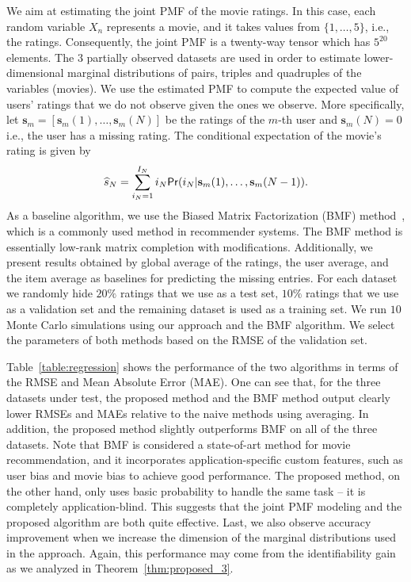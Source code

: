\documentclass[journal]{IEEEtran}
\begin{document}
We aim at estimating the joint PMF of the movie ratings. In this case, each random variable $X_n$ represents a movie, and it takes values from $\{1,\ldots,5\}$, i.e., the ratings.
Consequently, the joint PMF is a twenty-way tensor which has $5^{20}$ elements.
The $3$ partially observed datasets are used in order to estimate  {lower-dimensional} marginal distributions of pairs, triples and quadruples of the variables (movies). We use the estimated PMF to compute the expected value of  users' ratings that we do not observe given the ones we observe. More specifically, let  $\mathbf{s}_m = [\mathbf{s}_m(1),\ldots,\mathbf{s}_m(N)]$ be the ratings of the $m$-th user and $\mathbf{s}_m(N)=0$ i.e., the user has a missing rating. The conditional expectation of the movie's rating is given by
\[
\widehat{s}_N = \sum_{i_N = 1}^{I_N} i_N {\sf Pr}(i_N | \mathbf{s}_m(1),\ldots,\mathbf{s}_m(N-1)).
\]
As a baseline algorithm, we use the Biased Matrix Factorization (BMF) method~\cite{Koren2009}, which is a commonly used method in recommender systems. The BMF method is essentially low-rank matrix completion with modifications.
Additionally, we present results  obtained by global average of the ratings, the user average, and the item average  as baselines for predicting the missing entries. For each dataset we randomly hide $20\%$ ratings that we use as a test set, $10\%$ ratings that we use as a validation set and the remaining dataset is used as a training set. We run $10$ Monte Carlo simulations using our approach and the BMF algorithm. We select the parameters of both methods based on the RMSE of the validation set. 

Table~\ref{table:regression} shows the performance of the two algorithms in terms of the RMSE and Mean Absolute Error (MAE). One can see that, for the three datasets under test, the proposed method and the BMF method output clearly lower RMSEs and MAEs relative to the naive methods using averaging. In addition, the proposed method slightly outperforms BMF on all of the three datasets. Note that BMF is considered a state-of-art method for movie recommendation, and it incorporates application-specific custom features, such as user bias and movie bias to achieve good performance. The proposed method, on the other hand, only uses basic probability to handle the same task -- it is completely application-blind. This suggests that the joint PMF modeling and the proposed algorithm are both quite effective. Last, we also observe accuracy improvement when we increase the dimension of the marginal distributions used in the approach. Again, this performance may come from the identifiability gain as we analyzed in Theorem~\ref{thm:proposed_3}.
\end{document}
